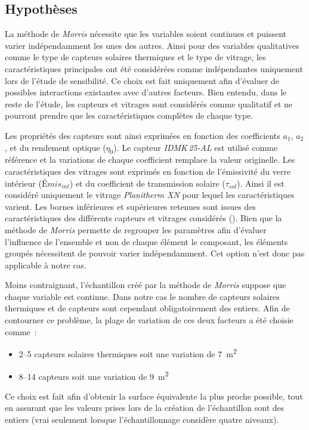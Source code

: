 \subsection{Hypothèses} %
\label{sub:hypotheses_morris}
La méthode de \textit{Morris} nécessite que les variables soient continues et
puissent varier indépendamment les unes des autres. Ainsi pour des variables qualitatives
comme le type de capteurs solaires thermiques et le type de vitrage, les caractéristiques
principales ont été considérées comme indépendantes uniquement lors de l’étude de
sensibilité. Ce choix est fait uniquement afin d’évaluer de possibles interactions existantes avec d’autres facteurs.
Bien entendu, dans le reste de l’étude, les capteurs et vitrages sont considérés comme
qualitatif et ne pourront prendre que les caractéristiques complètes de chaque type.

Les propriétés des capteurs sont ainsi exprimées en fonction des coefficients $a_{1}$,
$a_{2}$, et du rendement optique ($\eta_{0}$). Le capteur \textit{IDMK\,25-AL} est
utilisé comme référence et la variations de chaque coefficient remplace la valeur originelle.
Les caractéristiques des vitrages sont exprimés en fonction de l’émissivité
du verre intérieur ($Émis_{int}$) et du coefficient de transmission solaire ($\tau_{sol}$).
Ainsi il est considéré uniquement le vitrage \textit{Planitherm XN} pour lequel les
caractéristiques varient. Les bornes inférieures et supérieures retenues sont issues des caractéristiques
des différents capteurs et vitrages considérés ().
Bien que la méthode de \textit{Morris} permette de regrouper les paramètres afin d’évaluer
l’influence de l’ensemble et non de chaque élément le composant, les éléments groupés
nécessitent de pouvoir varier indépendamment. Cet option n’est donc pas applicable à notre cas.


Moins contraignant, l’échantillon créé par la méthode de \textit{Morris} suppose que
chaque variable est continue. Dans notre cas le nombre de capteurs solaires thermiques
et de capteurs  sont cependant obligatoirement des entiers. Afin de contourner
ce problème, la plage de variation de ces deux facteurs a été choisie comme~:
\begin{itemize}
  \item \SIrange{2}{5}{} capteurs solaires thermiques soit une variation de \SI{7}{\metre\squared}
  \item \SIrange{8}{14}{} capteurs  soit une variation de \SI{9}{\metre\squared}
\end{itemize}
Ce choix est fait afin d’obtenir la surface équivalente la plus proche possible, tout
en assurant que les valeurs prises lors de la création de l’échantillon sont des entiers
(vrai seulement lorsque l’échantillonnage considère quatre niveaux).


